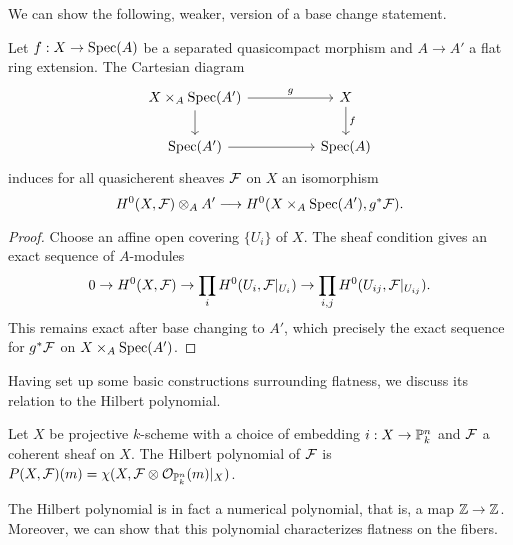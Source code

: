We can show the following, weaker, version of a base change statement. 
\begin{proposition}\label{prop: weak flat base change}
    Let $f:X\to \operatorname{Spec}(A)$ be a separated quasicompact morphism and $A\to A'$ a flat ring extension. The Cartesian diagram 
    $$%
    \begin{tikzcd}
        {X\times_{A}\spec(A')} && X \\
        {\spec(A')} && {\spec(A)}
        \arrow["g", from=1-1, to=1-3]
        \arrow[from=1-1, to=2-1]
        \arrow["f", from=1-3, to=2-3]
        \arrow[from=2-1, to=2-3]
    \end{tikzcd}$$
    induces for all quasicherent sheaves $\mathcal{F}$ on $X$ an isomorphism 
    $$H^{0}(X,\mathcal{F})\otimes_{A}A'\longrightarrow H^{0}(X\times_{A}\operatorname{Spec}(A'),g^{*}\mathcal{F}).$$
\end{proposition}
\begin{proof}
    Choose an affine open covering $\{U_{i}\}$ of $X$. The sheaf condition gives an exact sequence of $A$-modules
    $$0\to H^{0}(X,\mathcal{F})\to\prod_{i}H^{0}(U_{i},\mathcal{F}|_{U_{i}})\to\prod_{i,j}H^{0}(U_{ij},\mathcal{F}|_{U_{ij}}).$$
    This remains exact after base changing to $A'$, which precisely the exact sequence for $g^{*}\mathcal{F}$ on $X\times_{A}\operatorname{Spec}(A')$. 
\end{proof}
Having set up some basic constructions surrounding flatness, we discuss its relation to the Hilbert polynomial. 
\begin{definition}\label{def: hilbert polynomial}
    Let $X$ be projective $k$-scheme with a choice of embedding $i:X\to\mathbb{P}^{n}_{k}$ and $\mathcal{F}$ a coherent sheaf on $X$. The Hilbert polynomial of $\mathcal{F}$ is $P(X,\mathcal{F})(m)=\chi(X,\mathcal{F}\otimes\mathcal{O}_{\mathbb{P}^{n}_{k}}(m)|_{X})$. 
\end{definition}
The Hilbert polynomial is in fact a numerical polynomial, that is, a map $\mathbb{Z}\to\mathbb{Z}$. Moreover, we can show that this polynomial characterizes flatness on the fibers.